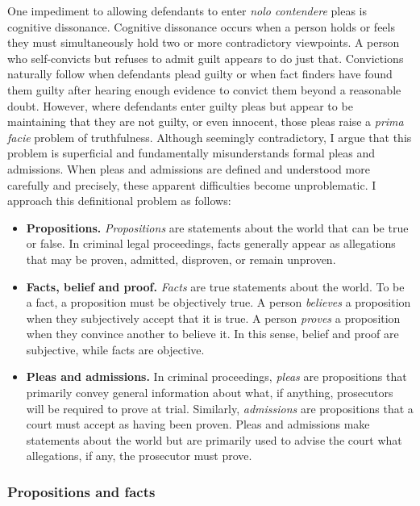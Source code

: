 One impediment to allowing defendants to enter \textit{nolo contendere} pleas is cognitive dissonance. Cognitive dissonance occurs when a person holds or feels they must simultaneously hold two or more contradictory viewpoints. A person who self-convicts but refuses to admit guilt appears to do just that. Convictions naturally follow when defendants plead guilty or when fact finders have found them guilty after hearing enough evidence to convict them beyond a reasonable doubt. However, where defendants enter guilty pleas but appear to be maintaining that they are not guilty, or even innocent, those pleas raise a \textit{prima facie} problem of truthfulness. Although seemingly contradictory, I argue that this problem is superficial and fundamentally misunderstands formal pleas and admissions. When pleas and admissions are defined and understood more carefully and precisely, these apparent difficulties become unproblematic. I approach this definitional problem as follows:

\begin{itemize}
    \item \textbf{Propositions.} \textit{Propositions} are statements about the world that can be true or false. In criminal legal proceedings, facts generally appear as allegations that may be proven, admitted, disproven, or remain unproven.
    \item \textbf{Facts, belief and proof.} \textit{Facts} are true statements about the world. To be a fact, a proposition must be objectively true. A person \textit{believes} a proposition when they subjectively accept that it is true. A person \textit{proves} a proposition when they convince another to believe it. In this sense, belief and proof are subjective, while facts are objective.
    \item \textbf{Pleas and admissions.} In criminal proceedings, \textit{pleas} are propositions that primarily convey general information about what, if anything, prosecutors will be required to prove at trial. Similarly, \textit{admissions} are propositions that a court must accept as having been proven. Pleas and admissions make statements about the world but are primarily used to advise the court what allegations, if any, the prosecutor must prove.
\end{itemize}

\subsubsection{Propositions and facts}

